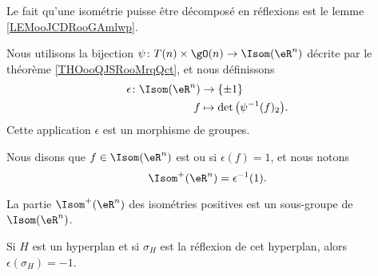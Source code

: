Le fait qu'une isométrie puisse être décomposé en réflexions est le lemme \ref{LEMooJCDRooGAmlwp}.

\begin{propositionDef}      \label{DEFooOKGSooUhDIfu} \label{DEFooUZFHooXVVLBL}
	Nous utilisons la bijection \( \psi\colon T(n)\times \gO(n)\to \Isom(\eR^n)\) décrite par le théorème \ref{THOooQJSRooMrqQct}, et nous définissons
	\begin{equation}
		\begin{aligned}
			\epsilon\colon \Isom(\eR^n) & \to \{ \pm 1 \}                         \\
			f                           & \mapsto \det\big( \psi^{-1}(f)_2 \big).
		\end{aligned}
	\end{equation}
    Cette application \( \epsilon\) est un morphisme de groupes.


    Nous disons que \( f\in\Isom(\eR^n)\) est  ou  si \( \epsilon(f)=1\), et nous notons
	\begin{equation}
		\Isom^+(\eR^n)=\epsilon^{-1}(1).
	\end{equation}
\end{propositionDef}

\begin{lemma}       \label{LEMooVRELooESIWQl}
	La partie \( \Isom^+(\eR^n)\) des isométries positives est un sous-groupe de \( \Isom(\eR^n)\).
\end{lemma}

\begin{lemma}    \label{LEMooJABDooOKHwWv}
    Si \( H\) est un hyperplan et si \( \sigma_{H}\) est la réflexion de cet hyperplan, alors \( \epsilon(\sigma_H)=-1\).
\end{lemma}

